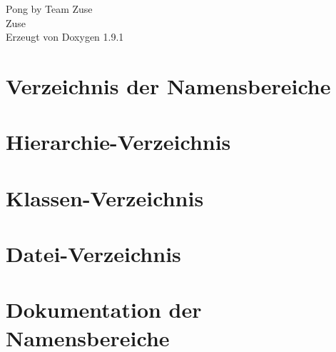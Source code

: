 \let\mypdfximage\pdfximage\def\pdfximage{\immediate\mypdfximage}\documentclass[twoside]{book}
\newcommand{\+}{\discretionary{\mbox{\scriptsize$\hookleftarrow$}}{}{}}
\newcommand{\clearemptydoublepage}{%
  \newpage{\pagestyle{empty}\cleardoublepage}%
}
\begin{document}
\raggedbottom

\hypersetup{pageanchor=false,
             bookmarksnumbered=true,
             pdfencoding=unicode
            }
\begin{titlepage}
\vspace*{7cm}
\begin{center}%
{\Large Pong by Team Zuse \\[1ex]\large Zuse }\\
\vspace*{1cm}
{\large Erzeugt von Doxygen 1.9.1}\\
\end{center}
\end{titlepage}
\clearemptydoublepage
{}
\tableofcontents
\clearemptydoublepage
{}
\hypersetup{pageanchor=true}

\chapter{Verzeichnis der Namensbereiche}

\chapter{Hierarchie-\/\+Verzeichnis}

\chapter{Klassen-\/\+Verzeichnis}

\chapter{Datei-\/\+Verzeichnis}

\chapter{Dokumentation der Namensbereiche}


\end{document}
